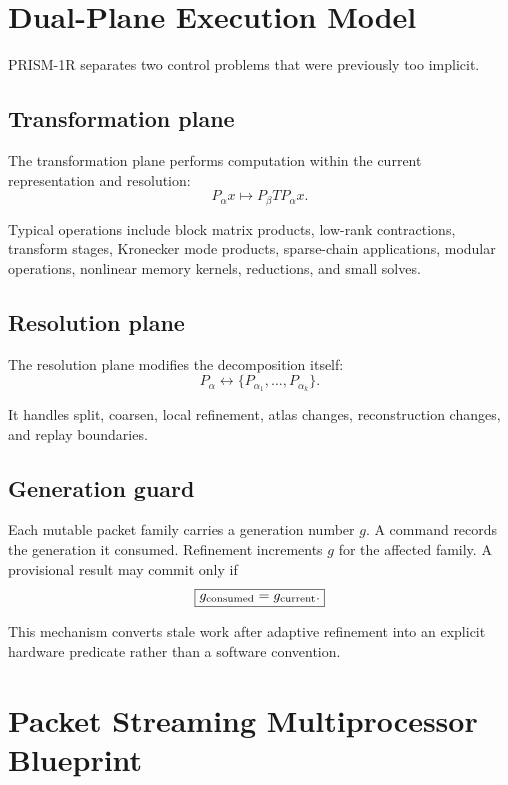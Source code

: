 \documentclass[10pt,letterpaper]{article}
\begin{document}
\section{Dual-Plane Execution Model}

PRISM-1R separates two control problems that were previously too implicit.

\subsection{Transformation plane}

The transformation plane performs computation within the current representation and resolution:
\[
P_\alpha x \longmapsto P_\beta T P_\alpha x.
\]

Typical operations include block matrix products, low-rank contractions, transform stages, Kronecker mode products, sparse-chain applications, modular operations, nonlinear memory kernels, reductions, and small solves.

\subsection{Resolution plane}

The resolution plane modifies the decomposition itself:
\[
P_\alpha \longleftrightarrow \{P_{\alpha_1},\ldots,P_{\alpha_k}\}.
\]

It handles split, coarsen, local refinement, atlas changes, reconstruction changes, and replay boundaries.

\subsection{Generation guard}

Each mutable packet family carries a generation number $g$. A command records the generation it consumed. Refinement increments $g$ for the affected family. A provisional result may commit only if
\[
\boxed{g_{\rm consumed}=g_{\rm current}.}
\]

This mechanism converts stale work after adaptive refinement into an explicit hardware predicate rather than a software convention.

\section{Packet Streaming Multiprocessor Blueprint}
\end{document}
